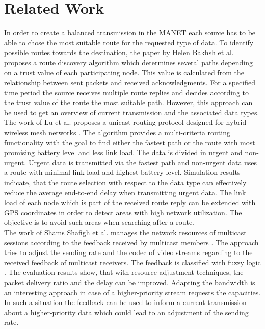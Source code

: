 \documentclass[conference]{IEEEtran}
\newcommand{\MANET}{MANET}
\newcommand{\VOIP}{VoIP}
\begin{document}
	\section{Related Work}
	In order to create a balanced transmission in the \MANET{} each source has to be able to chose the most suitable route for the requested type of data. To identify possible routes towards the destination, the paper by Helen Bakhsh et al. \cite{RelatedWork:MultiPath} proposes a route discovery algorithm which determines several paths depending on a trust value of each participating node. This value is calculated from the relationship between sent packets and received acknowledgments. For a specified time period the source receives multiple route replies and decides according to the trust value of the route the most suitable path. However, this approach can be used to get an overview of current transmission and the associated data types.\\
	The work of Lu et al. \cite{RelatedWork:QoSWMN} proposes a unicast routing protocol designed for hybrid wireless mesh networks \cite{RelatedWorkContent:WMN}. The algorithm provides a multi-criteria routing functionality with the goal to find either the fastest path or the route with most promising battery level and less link load. The data is divided in urgent and non-urgent. Urgent data is transmitted via the fastest path and non-urgent data uses a route with minimal link load and highest battery level. Simulation results indicate, that the route selection with respect to the data type can effectively reduce the average end-to-end delay when transmitting urgent data. The link load of each node which is part of the received route reply can be extended with GPS coordinates in order to detect areas with high network utilization. The objective is to avoid such areas when searching after a route.\\
	The work of Shams Shafigh et al. manages the network resources of multicast sessions according to the  feedback received by multicast members \cite{ReleatedWork:QoSSessionAdaptation}. The approach tries to adjust the sending rate and the codec of video streams regarding to the received feedback of multicast receivers. The feedback is classified with fuzzy logic \cite{RelatedWorkContent:QoSSessionAdaptationFuzzySets}\cite{RelatedWorkContent:QoSSessionAdaptationFuzzySets2}. The evaluation results show, that with resource adjustment techniques, the packet delivery ratio and the delay can be improved. Adapting the bandwidth is an interesting approach in case of a higher-priority stream requests the capacities. In such a situation the feedback can be used to inform a current transmission about a higher-priority data which could lead to an adjustment of the sending rate.
\end{document}
